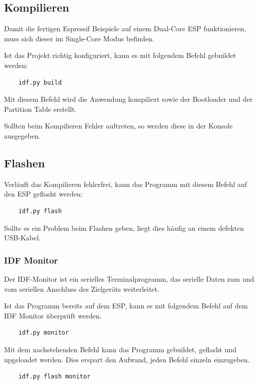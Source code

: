 \subsection{Kompilieren}
Damit die fertigen Espressif Beispiele auf einem Dual-Core ESP funktionieren, muss sich dieser im Single-Core Modus befinden.

Ist das Projekt richtig konfiguriert, kann es mit folgendem Befehl gebuildet werden:
\begin{verbatim}
    idf.py build
\end{verbatim}

Mit diesem Befehl wird die Anwendung kompiliert sowie der Bootloader und der Partition Table erstellt.

Sollten beim Kompilieren Fehler auftreten, so werden diese in der Konsole ausgegeben.

\subsection{Flashen}
Verläuft das Kompilieren fehlerfrei, kann das Programm mit diesem Befehl auf den ESP geflasht werden:
\begin{verbatim}
    idf.py flash
\end{verbatim}

Sollte es ein Problem beim Flashen geben, liegt dies häufig an einem defekten USB-Kabel.

\subsubsection{IDF Monitor}\label{sec:monitor}
Der IDF-Monitor ist ein serielles Terminalprogramm, das serielle Daten zum und vom seriellen Anschluss des Zielgeräts weiterleitet.

Ist das Programm bereits auf dem ESP, kann es mit folgendem Befehl auf dem IDF Monitor überprüft werden.

\begin{verbatim}
    idf.py monitor
\end{verbatim}

Mit dem nachstehenden Befehl kann das Programm gebuildet, geflasht und upgeloadet werden. Dies erspart den Aufwand, jeden Befehl einzeln einzugeben.

\begin{verbatim}
    idf.py flash monitor
\end{verbatim}


